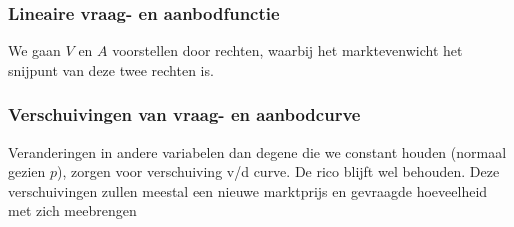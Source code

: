 \subsubsection{Lineaire vraag- en aanbodfunctie}
We gaan $V$ en $A$ voorstellen door rechten, waarbij het marktevenwicht het snijpunt van deze twee rechten is.

\subsubsection{Verschuivingen van vraag- en aanbodcurve}
Veranderingen in andere variabelen dan degene die we constant houden (normaal gezien $p$), zorgen voor verschuiving v/d curve. De rico blijft wel behouden. Deze verschuivingen zullen meestal een nieuwe marktprijs en gevraagde hoeveelheid met zich meebrengen








